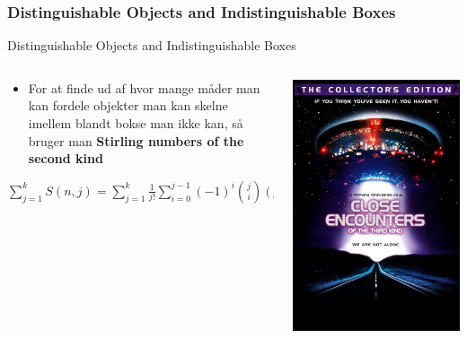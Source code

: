 \documentclass{beamer}
\begin{document}
\subsubsection{Distinguishable Objects and Indistinguishable Boxes}
\begin{frame}{Distinguishable Objects and Indistinguishable Boxes}
\begin{columns}
\begin{column}{0.5 \textwidth}
    
    \begin{itemize}
        \item For at finde ud af hvor mange måder man kan fordele objekter man kan skelne imellem blandt bokse man ikke kan, så bruger man \textbf{Stirling numbers of the second kind}
    \end{itemize}
        $\sum^k_{j=1}S(n,j) = \sum^k_{j=1}\frac{1}{j!}\sum^{j-1}_{i=0}(-1)^i\binom{j}{i}(j-i)^n$
\end{column}    
\begin{column}{0.5 \textwidth}
\includegraphics[scale=0.2]{image.png}
\end{column}    
\end{columns}
\end{frame}
\end{document}
